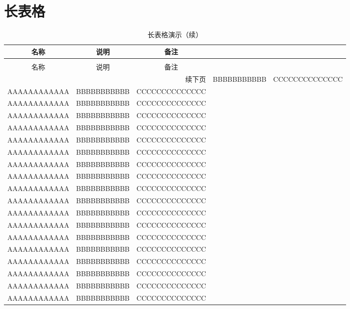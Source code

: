 \section{长表格}
\begin{longtable}{ccc}
\caption[长表格演示]{长表格演示} \label{tab:longtable} \\
\toprule[1.5pt]
名称  & 说明 & 备注\\
\midrule[1pt]
\endfirsthead
\caption[]{长表格演示（续）} \\
\toprule[1.5pt]
名称  & 说明 & 备注 \\
\midrule[1pt]
\endhead
\hline
\multicolumn{3}{r}{\small 续下页}
\endfoot
\bottomrule[1.5pt]
\endlastfoot

AAAAAAAAAAAA   &   BBBBBBBBBBB   &   CCCCCCCCCCCCCC   \\
AAAAAAAAAAAA   &   BBBBBBBBBBB   &   CCCCCCCCCCCCCC   \\
AAAAAAAAAAAA   &   BBBBBBBBBBB   &   CCCCCCCCCCCCCC   \\
AAAAAAAAAAAA   &   BBBBBBBBBBB   &   CCCCCCCCCCCCCC   \\
AAAAAAAAAAAA   &   BBBBBBBBBBB   &   CCCCCCCCCCCCCC   \\
AAAAAAAAAAAA   &   BBBBBBBBBBB   &   CCCCCCCCCCCCCC   \\
AAAAAAAAAAAA   &   BBBBBBBBBBB   &   CCCCCCCCCCCCCC   \\
AAAAAAAAAAAA   &   BBBBBBBBBBB   &   CCCCCCCCCCCCCC   \\
AAAAAAAAAAAA   &   BBBBBBBBBBB   &   CCCCCCCCCCCCCC   \\
AAAAAAAAAAAA   &   BBBBBBBBBBB   &   CCCCCCCCCCCCCC   \\
AAAAAAAAAAAA   &   BBBBBBBBBBB   &   CCCCCCCCCCCCCC   \\
AAAAAAAAAAAA   &   BBBBBBBBBBB   &   CCCCCCCCCCCCCC   \\
AAAAAAAAAAAA   &   BBBBBBBBBBB   &   CCCCCCCCCCCCCC   \\
AAAAAAAAAAAA   &   BBBBBBBBBBB   &   CCCCCCCCCCCCCC   \\
AAAAAAAAAAAA   &   BBBBBBBBBBB   &   CCCCCCCCCCCCCC   \\
AAAAAAAAAAAA   &   BBBBBBBBBBB   &   CCCCCCCCCCCCCC   \\
AAAAAAAAAAAA   &   BBBBBBBBBBB   &   CCCCCCCCCCCCCC   \\
AAAAAAAAAAAA   &   BBBBBBBBBBB   &   CCCCCCCCCCCCCC   \\
AAAAAAAAAAAA   &   BBBBBBBBBBB   &   CCCCCCCCCCCCCC   \\

\end{longtable}
